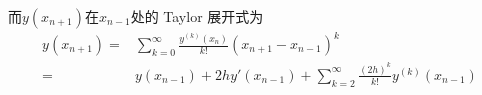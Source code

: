\documentclass[11pt]{article}
\begin{document}
\begin{question}
{\begin{align*}
        \end{align*}
        而$y(x_{n + 1})$在$x_{n - 1}$处的 Taylor 展开式为
        \begin{align*}
            y(x_{n + 1}) = & \sum_{k = 0}^{\infty}\frac{y^{(k)}(x_{n})}{k!}(x_{n + 1} - x_{n - 1})^k                   \\
            =              & y(x_{n - 1}) + 2hy'(x_{n - 1}) + \sum_{k = 2}^{\infty}\frac{(2h)^k}{k!}y^{(k)}(x_{n - 1})
        \end{align*}
}
\end{question}
\end{document}
